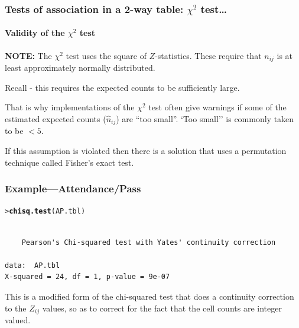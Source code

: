 \documentclass{beamer}\usepackage[]{graphicx}\usepackage[]{xcolor}
\makeatletter
\newcommand{\hlstd}[1]{\textcolor[rgb]{0.345,0.345,0.345}{#1}}%
\newcommand{\hlkwd}[1]{\textcolor[rgb]{0.737,0.353,0.396}{\textbf{#1}}}%
\newenvironment{kframe}{%
 \def\at@end@of@kframe{}%
 \ifinner\ifhmode%
  \def\at@end@of@kframe{\end{minipage}}%
  \begin{minipage}{\columnwidth}%
 \fi\fi%
 \def\FrameCommand##1{\hskip\@totalleftmargin \hskip-\fboxsep
 \colorbox{shadecolor}{##1}\hskip-\fboxsep
     \hskip-\linewidth \hskip-\@totalleftmargin \hskip\columnwidth}%
 \MakeFramed {\advance\hsize-\width
   \@totalleftmargin\z@ \linewidth\hsize
   \@setminipage}}%
 {\par\unskip\endMakeFramed%
 \at@end@of@kframe}
\newenvironment{knitrout}{}{} %
\makeatother
\begin{document}
\begin{frame}
\frametitle{Tests of association in a 2-way table: $\chi^2$ test\ldots}
\framesubtitle{Validity of the $\chi^2$ test}

{\bf NOTE:} The $\chi^2$ test uses the square of $Z$-statistics. These require that $n_{ij}$ is at least approximately normally distributed.

\bigskip

Recall - this requires the expected counts to be sufficiently large.

\bigskip

That is why implementations of the $\chi^2$ test often give warnings if some of the estimated expected counts ($\hat{n}_{ij}$) are ``too small''. `Too small'' is commonly taken to be $<5$.

\bigskip

If this assumption is violated then there is a solution that uses a permutation technique called  Fisher's exact test.

\end{frame}


\begin{frame}[fragile]
\frametitle{Example---Attendance/Pass}
\begin{knitrout}\scriptsize
{}\color{fgcolor}\begin{kframe}
\begin{alltt}
\hlstd{> }\hlkwd{chisq.test}\hlstd{(AP.tbl)}
\end{alltt}
\begin{verbatim}

	Pearson's Chi-squared test with Yates' continuity correction

data:  AP.tbl
X-squared = 24, df = 1, p-value = 9e-07
\end{verbatim}
\end{kframe}
\end{knitrout}
\medskip
This is a modified form of the chi-squared test that does a continuity correction
to the $Z_{ij}$ values, so as to correct for the fact that the cell counts
are integer valued.

\end{frame}
\end{document}
